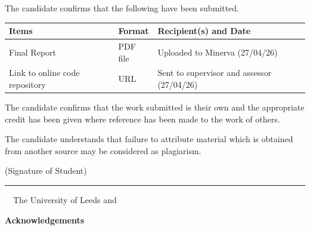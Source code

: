 \frontcover

\clearpage

\noindent The candidate confirms that the following have been submitted.\\


\begin{table}[ht!]
\begin{tabular}{|p{}|p{}|p{}|}
\hline 
Items & Format & Recipient(s) and Date \\ 
\hline 
Final Report & PDF file & Uploaded to Minerva (27/04/26) \\ 
\hline 
Link to online code repository & URL & Sent to supervisor and assessor (27/04/26) \\ 
\hline 
\end{tabular} 
\end{table}


\vfill

\noindent The candidate confirms that the work submitted is their own and the appropriate credit has been given where reference has been made to the work of others.

\vfill

\noindent The candidate understands that failure to attribute material which is obtained from another source may be considered as plagiarism.

\vfill

\begin{flushright}
(Signature of Student) \rule{50mm}{1pt}
\end{flushright}

\vfill

\textcopyright~\session~The University of Leeds and~\fullname

\clearpage
{}
\setcounter{page}{1}

\begin{dissertationsummary}

\end{dissertationsummary}

\clearpage
\begin{center}
\textbf{Acknowledgements}
\end{center}


\begingroup
\setlength{\parskip}{0pt}
\singlespacing
\tableofcontents
\endgroup

\clearpage

